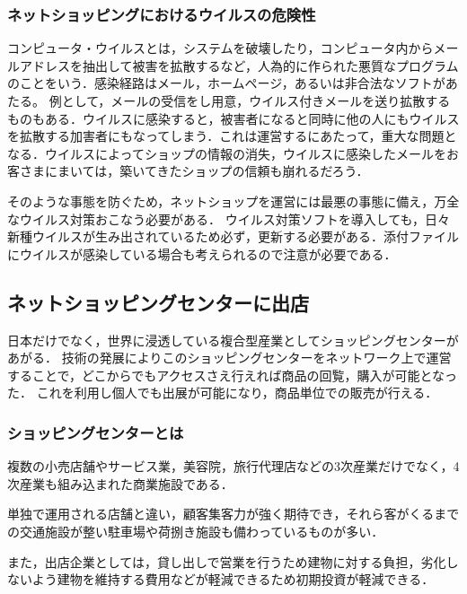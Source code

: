 \subsubsection{ネットショッピングにおけるウイルスの危険性}

コンピュータ・ウイルスとは，システムを破壊したり，コンピュータ内からメールアドレスを抽出して被害を拡散するなど，人為的に作られた悪質なプログラムのことをいう．感染経路はメール，ホームページ，あるいは非合法なソフトがあたる。
例として，メールの受信をし用意，ウイルス付きメールを送り拡散するものもある．ウイルスに感染すると，被害者になると同時に他の人にもウイルスを拡散する加害者にもなってしまう．これは運営するにあたって，重大な問題となる．ウイルスによってショップの情報の消失，ウイルスに感染したメールをお客さまにまいては，築いてきたショップの信頼も崩れるだろう．

そのような事態を防ぐため，ネットショップを運営には最悪の事態に備え，万全なウイルス対策おこなう必要がある．
ウイルス対策ソフトを導入しても，日々新種ウイルスが生み出されているため必ず，更新する必要がある．添付ファイルにウイルスが感染している場合も考えられるので注意が必要である．





\subsection{ネットショッピングセンターに出店}

日本だけでなく，世界に浸透している複合型産業としてショッピングセンターがあがる．
技術の発展によりこのショッピングセンターをネットワーク上で運営することで，どこからでもアクセスさえ行えれば商品の回覧，購入が可能となった．
これを利用し個人でも出展が可能になり，商品単位での販売が行える．

\subsubsection{ショッピングセンターとは}

複数の小売店舗やサービス業，美容院，旅行代理店などの3次産業だけでなく，4次産業も組み込まれた商業施設である．

単独で運用される店舗と違い，顧客集客力が強く期待でき，それら客がくるまでの交通施設が整い駐車場や荷捌き施設も備わっているものが多い．

また，出店企業としては，貸し出しで営業を行うため建物に対する負担，劣化しないよう建物を維持する費用などが軽減できるため初期投資が軽減できる．

